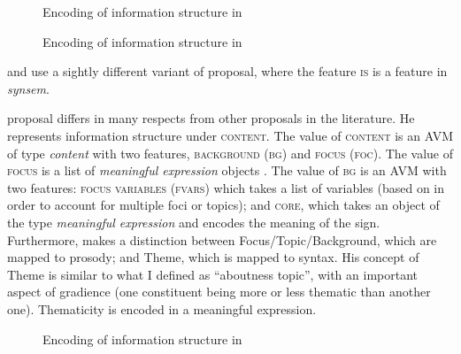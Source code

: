 \begin{figure}[h]
\captionsetup{margin=.05\linewidth}
\begin{floatrow}
{\caption{Encoding of information structure in \citet[147]{Bildhauer.2008}}}
\ffigbox
{}
{\caption{Encoding of information structure in \citet[74]{Bildhauer.2010}}}
\end{floatrow}
\end{figure}

\citet{Bildhauer.2010} and \citet*{Mueller.S.2020?.chapter5} use a sightly different variant of  proposal, where the feature \textsc{is} is a feature in \emph{synsem}.

 proposal differs in many respects from other proposals in the literature. He represents information structure under \textsc{content}. The value of \textsc{content} is an AVM of type \emph{content} with two features, \textsc{background (bg)} and \textsc{focus (foc)}. The value of \textsc{focus} is a list of \emph{meaningful expression} objects \citep{Richter.2000}. The value of \textsc{bg} is an AVM with two features: \textsc{focus variables (fvars)} which takes a list of variables (based on \citet{Krifka.1992} in order to account for multiple foci or topics); and \textsc{core}, which takes an object of the type \emph{meaningful expression} and encodes the meaning of the sign.
Furthermore, \citet[310]{Webelhuth.2007} makes a distinction between Focus\slash Topic\slash Background, which are mapped to prosody; and Theme, which is mapped to syntax. His concept of Theme is similar to what I defined as ``aboutness topic'', with an important aspect of gradience (one constituent being more or less thematic than another one). Thematicity is encoded in a meaningful expression.

\begin{figure}[h] 
\caption{Encoding of information structure in \citet[312]{Webelhuth.2007}}
\end{figure}

